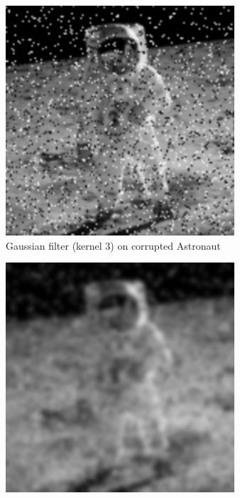 \documentclass{article}
\begin{document}
\begin{figure}[H]
	\begin{subfigure}{0.3\textwidth}
		\includegraphics[width=\textwidth]{Generated/Astronaut_salt_pepper_gaussian3filter.png}
		\caption{Gaussian filter (kernel 3) on corrupted Astronaut}
		\label{fig:gaussian3_Astronaut}
	\end{subfigure}
	\hfill
	\begin{subfigure}{0.3\textwidth}
		\includegraphics[width=\textwidth]{Generated/Astronaut_salt_pepper_gaussian21filter.png}

\end{subfigure}
\end{figure}
\end{document}
